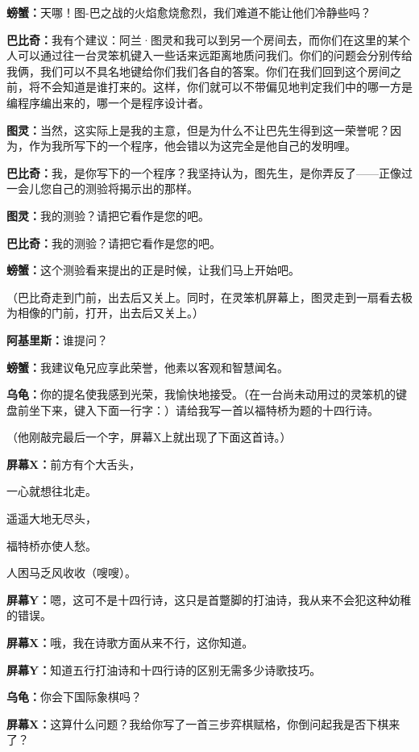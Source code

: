 \documentclass[
  12pt,
  twoside,
  openright,
  oldfontcommands,
]{memoir}
\newcommand{\kaitismall}[1]{{\kaitifamily\small #1}}
\newcommand{\dialogname}[1]{{\sffamily\bfseries #1}}
\begin{document}
\dialogname{螃蟹：}天哪！图-巴之战的火焰愈烧愈烈，我们难道不能让他们冷静些吗？

\dialogname{巴比奇：}我有个建议：阿兰·图灵和我可以到另一个房间去，而你们在这里的某个人可以通过往一台灵笨机键入一些话来远距离地质问我们。你们的问题会分别传给我俩，我们可以不具名地键给你们我们各自的答案。你们在我们回到这个房间之前，将不会知道是谁打来的。这样，你们就可以不带偏见地判定我们中的哪一方是编程序编出来的，哪一个是程序设计者。

\dialogname{图灵：}当然，这实际上是我的主意，但是为什么不让巴先生得到这一荣誉呢？因为，作为我所写下的一个程序，他会错以为这完全是他自己的发明哩。

\dialogname{巴比奇：}我，是你写下的一个程序？我坚持认为，图先生，是你弄反了------正像过一会儿您自己的测验将揭示出的那样。

\dialogname{图灵：}我的测验？请把它看作是您的吧。

\dialogname{巴比奇：}我的测验？请把它看作是您的吧。

\dialogname{螃蟹：}这个测验看来提出的正是时候，让我们马上开始吧。

（巴比奇走到门前，出去后又关上。同时，在灵笨机屏幕上，图灵走到一扇看去极为相像的门前，打开，出去后又关上。）

\dialogname{阿基里斯：}谁提问？

\dialogname{螃蟹：}我建议龟兄应享此荣誉，他素以客观和智慧闻名。

\dialogname{乌龟：}你的提名使我感到光荣，我愉快地接受。\kaitismall{（在一台尚未动用过的灵笨机的键盘前坐下来，键入下面一行字：）}请给我写一首以福特桥为题的十四行诗。

（他刚敲完最后一个字，屏幕X上就出现了下面这首诗。）

\dialogname{屏幕X：}前方有个大舌头，

一心就想往北走。

遥遥大地无尽头，

福特桥亦使人愁。

人困马乏风收收（嗖嗖）。

\dialogname{屏幕Y：}嗯，这可不是十四行诗，这只是首蹩脚的打油诗，我从来不会犯这种幼稚的错误。

\dialogname{屏幕X：}哦，我在诗歌方面从来不行，这你知道。

\dialogname{屏幕Y：}知道五行打油诗和十四行诗的区别无需多少诗歌技巧。

\dialogname{乌龟：}你会下国际象棋吗？

\dialogname{屏幕X：}这算什么问题？我给你写了一首三步弈棋赋格，你倒问起我是否下棋来了？
\end{document}
